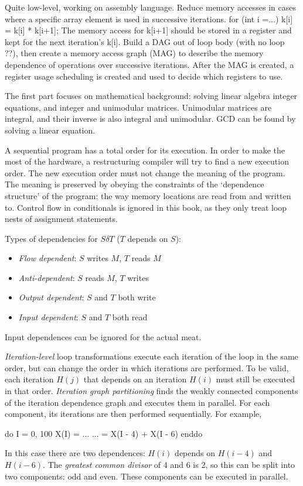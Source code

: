 Quite low-level, working on assembly language.
Reduce memory accesses in cases where a specific array element is used in successive iterations.
  for (int i =...)
    k[i] = k[i] * k[i+1];
The memory access for k[i+1] should be stored in a register and kept for the next iteration's k[i].
Build a DAG out of loop body (with no loop ??), then create a memory access graph (MAG) to describe the memory dependence of operations over successive iterations.
After the MAG is created, a register usage scheduling is created and used to decide which registers to use.


The first part focuses on mathematical background: solving linear algebra integer equations, and integer and unimodular matrices.
Unimodular matrices are integral, and their inverse is also integral and unimodular. GCD can be found by solving a linear equation.

A sequential program has a total order for its execution. In order to make the most of the hardware, a restructuring compiler
will try to find a new execution order. The new execution order must not change the meaning of the program.
The meaning is preserved by obeying the constraints of the `dependence structure' of the program:
the way memory locations are read from and written to.
Control flow in conditionals is ignored in this book, as they only treat loop nests of assignment statements.

Types of dependencies for $S \delta T$ ($T$ depends on $S$):
\begin{itemize}
\item \emph{Flow dependent}: $S$ writes $M$, $T$ reads $M$
\item \emph{Anti-dependent}: $S$ reads $M$, $T$ writes
\item \emph{Output dependent}: $S$ and $T$ both write
\item \emph{Input dependent}: $S$ and $T$ both read
\end{itemize}

Input dependences can be ignored for the actual meat.

\emph{Iteration-level} loop transformations execute each iteration of the loop in the same order, but can change the order in which iterations are performed.
To be valid, each iteration $H(j)$ that depends on an iteration $H(i)$ must still be executed in that order.
\emph{Iteration graph partitioning} finds the weakly connected components of the iteration dependence graph and executes them in parallel. For each component, its iterations are then performed sequentially.
For example,
\begin{code}
do I = 0, 100
    X(I) = ...
    ...  = X(I - 4) + X(I - 6)
enddo
\end{code}
In this case there are two dependences: $H(i)$ depends on $H(i-4)$ and $H(i-6)$.
The \emph{greatest common divisor} of 4 and 6 is 2, so this can be split into two components: odd and even.
These components can be executed in parallel.

